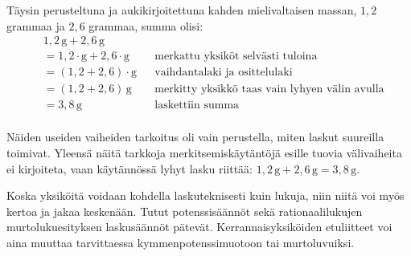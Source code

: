 \begin{esimerkki}
Täysin perusteltuna ja aukikirjoitettuna kahden mielivaltaisen massan, $1,2$ grammaa ja $2,6$ grammaa, summa olisi:
\begin{align*}
&1,2\,\text{g}+2,6\,\text{g} && \\
&=1,2\cdot \text{g}+2,6\cdot \text{g} && \text{merkattu yksiköt selvästi tuloina} \\
&=(1,2+2,6)\cdot \text{g} && \text{vaihdantalaki ja osittelulaki} \\ %
&=(1,2+2,6)\,\text{g} && \text{merkitty yksikkö taas vain lyhyen välin avulla} \\
&=3,8\,\text{g} && \text{laskettiin summa} \\
\end{align*}

Näiden useiden vaiheiden tarkoitus oli vain perustella, miten laskut suureilla toimivat. Yleensä näitä tarkkoja merkitsemiskäytäntöjä esille tuovia välivaiheita ei kirjoiteta, vaan käytännössä lyhyt lasku riittää: $1,2\,\text{g}+2,6\,\text{g}=3,8\,\text{g}$.
\end{esimerkki}


Koska yksiköitä voidaan kohdella laskuteknisesti kuin lukuja, niin niitä voi myös kertoa ja jakaa keskenään. Tutut potenssisäännöt sekä rationaalilukujen murtolukuesityksen laskusäännöt pätevät. Kerrannaisyksiköiden etuliitteet voi aina muuttaa tarvittaessa kymmenpotenssimuotoon tai murtoluvuiksi.

%
%
%	
%

